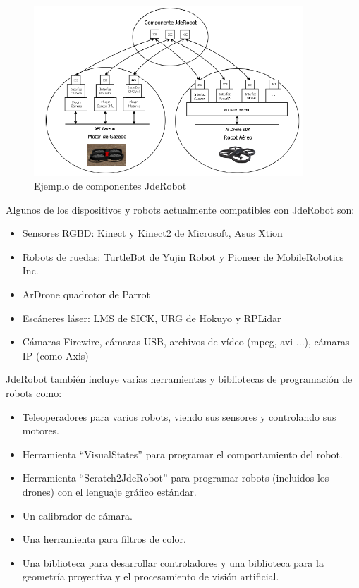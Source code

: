 \begin{figure}[H]
  \begin{center}
    \includegraphics[width=0.9\textwidth]{figures/Infraestructura/jderobot.png}
		\caption{Ejemplo de componentes JdeRobot }
		\label{fig.jderobot}
		\end{center}
\end{figure}

Algunos de los dispositivos y robots actualmente compatibles con JdeRobot son:
\begin{itemize}
	\item Sensores RGBD: Kinect y Kinect2 de Microsoft, Asus Xtion
	\item Robots de ruedas: TurtleBot de Yujin Robot y Pioneer de MobileRobotics Inc.
	\item ArDrone quadrotor de Parrot
	\item Escáneres láser: LMS de SICK, URG de Hokuyo y RPLidar
	\item Cámaras Firewire, cámaras USB, archivos de vídeo (mpeg, avi ...), cámaras IP (como Axis)
\end{itemize}


JdeRobot también incluye varias herramientas y bibliotecas de programación de robots como:
\begin{itemize}
	\item Teleoperadores para varios robots, viendo sus sensores y controlando sus motores. 
	\item Herramienta ``VisualStates'' para programar el comportamiento del robot.
	\item Herramienta ``Scratch2JdeRobot'' para programar robots (incluidos los drones) con el lenguaje gráfico estándar.
	\item Un calibrador de cámara.
	\item Una herramienta para filtros de color.
	\item Una biblioteca para desarrollar controladores y una biblioteca para la geometría proyectiva y el procesamiento de visión artificial.
\end{itemize}

